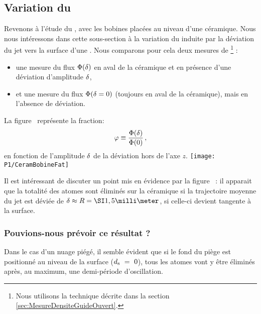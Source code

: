 \subsection{Variation du \fat}\label{sec:ResultatVariationFlux}
Revenons à l'étude du \fispse, avec les bobines placées au niveau d'une céramique. 
Nous nous intéressons dans cette sous-section à la variation du \fat induite par la déviation du jet vers la surface d'une \pdec. 
%
Nous comparons pour cela deux mesures de \fat%
\footnote{Nous utilisons la technique décrite dans la section \vref{sec:MesureDensiteGuideOuvert}.}%
:
\begin{itemize}
	\item une mesure du flux ${\Phi}({\delta})$ %
	 en aval de la céramique et en présence d'une déviation d'amplitude ${\delta}$,
	\item et une mesure du flux ${\Phi}({\delta}=0)$ (toujours en aval de la céramique), mais en l'absence de déviation.
\end{itemize}
La figure~ représente la fraction:%
%
\[
{\varphi}\equiv\frac{{\Phi}({\delta})}{{\Phi}(0)}
\, ,
\]
en fonction de l'amplitude ${\delta}$ de la déviation hors de l'axe $z$.
\bfighs
\texttt{[image: P1/CeramBobineFat]}
\label{fig:CeramBobineFat}
\efigh



\casse


\noindent Il est intéressant de discuter un point mis en évidence par la figure~ : il apparait que la totalité des atomes sont éliminés sur la céramique si la trajectoire moyenne du jet est déviée de $\Devi\approx\CeramRay=\mm{1,5}$, \cad si celle-ci devient tangente à la surface. 
%


\subsubsection{Pouvions-nous prévoir ce résultat ?}
Dans le cas d'un nuage piégé, il semble évident que si le fond du piège est positionné au niveau de la surface (${d_{\rm s}}~=~0$), tous les atomes vont y être éliminés après, au maximum, une demi-période d'oscillation. \label{Rq:PrevoirResultatDevi}


